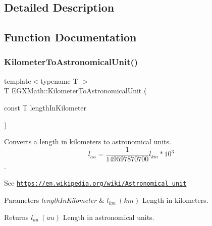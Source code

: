 \subsection{Detailed Description}


\subsection{Function Documentation}
\mbox{\label{group___e_g_x_math-_conversions-_length_conversions-_kilometer-_astronomical_ga4c5c2b67611651c04072bfbb394a4ca7}} 
\subsubsection{\texorpdfstring{Kilometer\+To\+Astronomical\+Unit()}{KilometerToAstronomicalUnit()}}
{\footnotesize\ttfamily template$<$typename T $>$ \\
T E\+G\+X\+Math\+::\+Kilometer\+To\+Astronomical\+Unit (\begin{DoxyParamCaption}\item[{const T}]{length\+In\+Kilometer }\end{DoxyParamCaption})}



Converts a length in kilometers to astronomical units. \[ l_{au}= \frac{1}{149597870700} l_{km} * 10^{3} \]. 

See \href{https://en.wikipedia.org/wiki/Astronomical_unit}{\tt https\+://en.\+wikipedia.\+org/wiki/\+Astronomical\+\_\+unit} 
\begin{DoxyParams}{Parameters}
{\em length\+In\+Kilometer} & $ l_{km}\ (km)$ Length in kilometers. \\
\hline
\end{DoxyParams}
\begin{DoxyReturn}{Returns}
$ l_{au}\ (au)$ Length in astronomical units. 
\end{DoxyReturn}
\mbox{\label{group___e_g_x_math-_conversions-_length_conversions-_kilometer-_astronomical_ga265181afd822c061f51a157da711c0c5}} 
